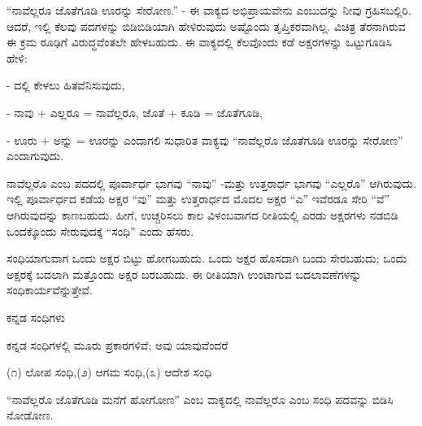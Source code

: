 
\indent “ನಾವೆಲ್ಲರೂ ಜೊತೆಗೂಡಿ ಊರನ್ನು ಸೇರೋಣ.” - ಈ ವಾಕ್ಯದ ಅಭಿಪ್ರಾಯವೇನು ಎಂಬುದನ್ನು ನೀವು ಗ್ರಹಿಸಬಲ್ಲಿರಿ. ಆದರೆ, ಇಲ್ಲಿ ಕೆಲವು ಪದಗಳನ್ನು ಬಿಡಿಬಿಡಿಯಾಗಿ ಹೇಳಿರುವುದು ಅಷ್ಟೊಂದು ತೃಪ್ತಿಕರವಾಗಿಲ್ಲ. ವಿಚಿತ್ರ ತೆರನಾಗಿರುವ ಈ ಕ್ರಮ ರೂಢಿಗೆ ವಿರುದ್ಧವೆಂತಲೇ ಹೇಳಬಹುದು. ಈ ವಾಕ್ಯದಲ್ಲಿ ಕೆಲವೊಂದು ಕಡೆ ಅಕ್ಷರಗಳನ್ನು ಒಟ್ಟುಗೂಡಿಸಿ ಹೇಳಿ:\par

\indent - ದಲ್ಲಿ ಕೇಳಲು ಹಿತವೆನಿಸುವುದು,\par

\indent - ನಾವು + ಎಲ್ಲರೂ = ನಾವೆಲ್ಲರೂ, ಜೊತೆ + ಕೂಡಿ = ಜೊತೆಗೂಡಿ,\par

\indent - ಊರು + ಅನ್ನು = ಊರನ್ನು ಎಂದಾಗಲಿ ಸುಧಾರಿತ ವಾಕ್ಯವು “ನಾವೆಲ್ಲರೊ ಜೊತೆಗೂಡಿ ಊರನ್ನು ಸೇರೋಣ” ಎಂದಾಗುವುದು.\par

\indent ನಾವೆಲ್ಲರೊ ಎಂಬ ಪದದಲ್ಲಿ ಪೂರ್ವಾರ್ಧ ಭಾಗವು “ನಾವು” -ಮತ್ತು ಉತ್ತರಾರ್ಧ ಭಾಗವು “ಎಲ್ಲರೊ” ಆಗಿರುವುದು. ಇಲ್ಲಿ ಪೂರ್ವಾರ್ಧದ ಕಡೆಯ ಅಕ್ಷರ “ವು” ಮತ್ತು ಉತ್ತರಾರ್ಧದ ಮೊದಲ ಅಕ್ಷರ “ಎ” ಇವೆರಡೂ ಸೇರಿ “ವೆ” ಆಗಿರುವುದನ್ನು ಕಾಣಬಹುದು. ಹೀಗೆ, ಉಚ್ಚರಿಸಲು ಕಾಲ ವಿಳಂಬವಾಗದ ರೀತಿಯಲ್ಲಿ ಎರಡು ಅಕ್ಷರಗಳು ನಡಬಿಡಿ ಒಂದಕ್ಕೊಂದು ಸೇರುವುದಕ್ಕೆ “ಸಂಧಿ” ಎಂದು ಹೆಸರು.\par

\begin{kbvrule}
\noindent\kbvbullet\hspace{0.5em}ಸಂಧಿಯಾಗುವಾಗ ಒಂದು ಅಕ್ಷರ ಬಿಟ್ಟು ಹೋಗಬಹುದು. ಒಂದು ಅಕ್ಷರ ಹೊಸದಾಗಿ ಬಂದು ಸೇರಬಹುದು; ಒಂದು ಅಕ್ಷರಕ್ಕೆ ಬದಲಾಗಿ ಮತ್ತೊಂದು ಅಕ್ಷರ ಬರಬಹುದು. ಈ ರೀತಿಯಾಗಿ ಉಂಟಾಗುವ ಬದಲಾವಣೆಗಳನ್ನು ಸಂಧಿಕಾರ್ಯವೆನ್ನುತ್ತೇವೆ.
\end{kbvrule}

\vspace{6pt plus 5pt minus 1pt}\begin{center}{\kbvsecfont\fontsize{12.5pt}{16pt}\selectfont\color{kbvaccentdark} ಕನ್ನಡ ಸಂಧಿಗಳು}\end{center}\vspace{3pt plus 3pt minus 1pt}

\indent ಕನ್ನಡ ಸಂಧಿಗಳಲ್ಲಿ ಮೂರು ಪ್ರಕಾರಗಳಿವೆ; ಅವು ಯಾವುವೆಂದರೆ\par

\vspace{2pt plus 2pt}\noindent\hspace*{1.5em}(೧) ಲೋಪ ಸಂಧಿ,\hfill (೨) ಆಗಮ ಸಂಧಿ,\hfill (೩) ಆದೇಶ ಸಂಧಿ\hspace*{1.5em}\par\vspace{2pt plus 2pt}


\indent “ನಾವೆಲ್ಲರೊ ಜೊತೆಗೂಡಿ ಮನೆಗೆ ಹೋಗೋಣ” ಎಂಬ ವಾಕ್ಯದಲ್ಲಿ ನಾವೆಲ್ಲರೊ ಎಂಬ ಸಂಧಿ ಪದವನ್ನು ಬಿಡಿಸಿ ನೋಡೋಣ.\par
